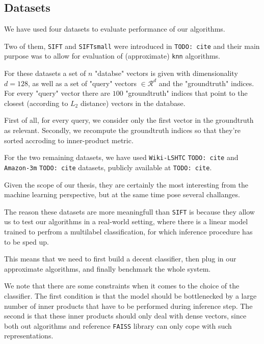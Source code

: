     \subsection{Datasets}\label{sec:datasets}

        We have used four datasets to evaluate performance of our algorithms.

        Two of them, \texttt{SIFT} and \texttt{SIFTsmall} were introduced in \texttt{TODO: cite} and their
        main purpose was to allow for evaluation of (approximate) \texttt{knn} algorithms.

        For these datasets a set of $n$ "databse" vectors is given with dimensionality
        $d=128$, as well as a set of "query" vectors $\in \mathcal{R}^d$
        and the "groundtruth" indices. For every "query" vector there are $100$ "groundtruth" indices
        that point to the closest (according to $L_2$ distance) vectors in the database.

        First of all, for every query, we consider only the first vector in the groundtruth as relevant.
        Secondly, we recompute the groundtruth indices so that they're sorted accroding to inner-product
        metric.

        For the two remaining datasets, we have used \texttt{Wiki-LSHTC} \texttt{TODO: cite} and \texttt{Amazon-3m}
        \texttt{TODO: cite} datasets, publicly available at \texttt{TODO: cite}.

        Given the scope of our thesis, they are certainly the most interesting from the machine learning perspective,
        but at the same time pose several challanges.

        The reason these datasets are more meaningfull than \texttt{SIFT} is because they allow us to test our
        algorithms in a real-world setting, where there is a linear model trained to perfrom a multilabel
        classification, for which inference procedure has to be sped up.

        This means that we need to first build a decent classifier, then plug in our approximate algorithms,
        and finally benchmark the whole system.

        We note that there are some constraints when it comes to the choice of the classifier. The first condition
        is that the model should be bottlenecked by a large number of inner products that have to be performed during
        inference step. The second is that these inner products should only deal with dense vectors, since both
        out algorithms and reference \texttt{FAISS} library can only cope with such representations.

